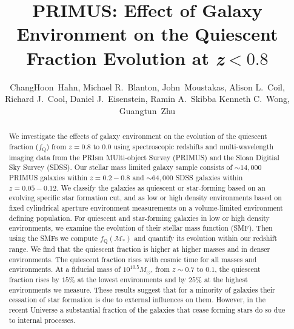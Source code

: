 \documentclass{emulateapj}
\begin{document}
\title{PRIMUS: Effect of Galaxy Environment on the Quiescent Fraction Evolution at \lowercase{\textit{z}}$<0.8$}
\author{
ChangHoon~Hahn, 
Michael R.~Blanton, 
John~Moustakas,
Alison L.~Coil, 
Richard J.~Cool, 
Daniel J.~Eisenstein,
Ramin A.~Skibba
Kenneth C.~Wong, 
Guangtun~Zhu
}
\begin{abstract}
We investigate the effects of galaxy environment on the evolution of
the quiescent fraction ($f_{\mathrm{Q}}$) from $z =0.8 $ to $ 0.0$ using
spectroscopic redshifts and multi-wavelength imaging data from the
PRIsm MUlti-object Survey (PRIMUS) and the Sloan Digitial Sky Survey
(SDSS). Our stellar mass limited galaxy sample consists of $\sim
14,000$ PRIMUS galaxies within $z = 0.2-0.8$ and $\sim 64,000$ SDSS
galaxies within $z = 0.05-0.12$. We classify the galaxies as quiescent
or star-forming based on an evolving specific star formation cut, and
as low or high density environments based on fixed cylindrical
aperture environment measurements on a volume-limited environment
defining population. For quiescent and
star-forming galaxies in low or high density environments, we examine
the evolution of their stellar mass function (SMF). Then using the
SMFs we compute $f_{\mathrm{Q}}(\mathcal{M}_{*})$ and quantify its
evolution within our redshift range. We find that the quiescent
fraction is higher at higher masses and in denser environments. The
quiescent fraction rises with cosmic time for all masses and
environments. At a fiducial mass of $10^{10.5}M_\odot$, from $z\sim
0.7$ to $0.1$, the quiescent fraction rises by $15\%$ at the
lowest environments and by $25\%$ at the highest environments we measure.
These results suggest that for a minority of galaxies their cessation
of star formation is due to external influences on
them. However, in the recent Universe a substantial fraction of the
galaxies that cease forming stars do so due to internal processes.
\end{abstract}
\end{document}
